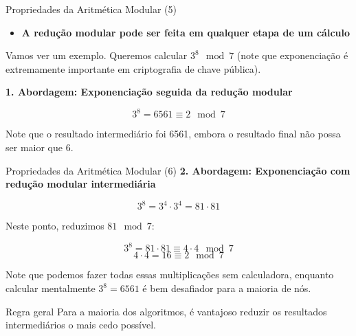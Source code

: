 \documentclass{beamer}
\begin{document}
\begin{frame}{Propriedades da Aritmética Modular (5)}
\begin{itemize}
    \item \textbf{A redução modular pode ser feita em qualquer etapa de um cálculo}
\end{itemize}

Vamos ver um exemplo. Queremos calcular $3^8 \mod 7$ (note que exponenciação é extremamente importante em criptografia de chave pública).

\vspace{0.5em}
\textbf{1. Abordagem: Exponenciação seguida da redução modular}

\[
3^8 = 6561 \equiv 2 \mod 7
\]

Note que o resultado intermediário foi 6561, embora o resultado final não possa ser maior que 6.

\end{frame}




\begin{frame}{Propriedades da Aritmética Modular (6)}
\textbf{2. Abordagem: Exponenciação com redução modular intermediária}

\[
3^8 = 3^4 \cdot 3^4 = 81 \cdot 81
\]

Neste ponto, reduzimos $81 \mod 7$:

\[
3^8 = 81 \cdot 81 \equiv 4 \cdot 4 \mod 7
\]
\[
4 \cdot 4 = 16 \equiv 2 \mod 7
\]


Note que podemos fazer todas essas multiplicações sem calculadora, enquanto calcular mentalmente $3^8 = 6561$ é bem desafiador para a maioria de nós.

\vspace{0.5em}
\begin{block}{Regra geral}
\centering
Para a maioria dos algoritmos, é vantajoso reduzir os resultados intermediários o mais cedo possível.
\end{block}
\end{frame}


\end{document}
